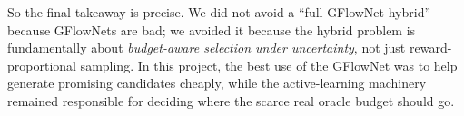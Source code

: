 \documentclass[10pt]{article}
\begin{document}
So the final takeaway is precise. We did not avoid a ``full GFlowNet hybrid'' because GFlowNets are bad; we avoided it because the hybrid problem is fundamentally about \emph{budget-aware selection under uncertainty}, not just reward-proportional sampling. In this project, the best use of the GFlowNet was to help generate promising candidates cheaply, while the active-learning machinery remained responsible for deciding where the scarce real oracle budget should go.
\end{document}
